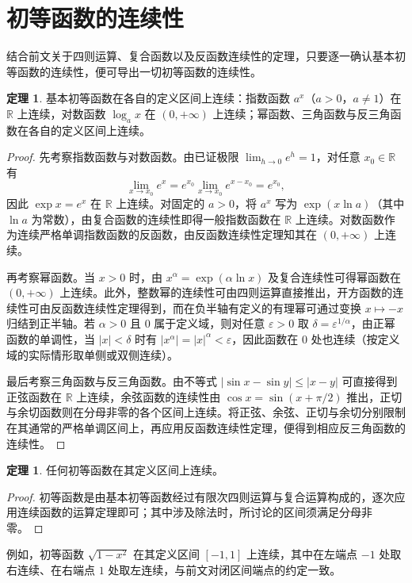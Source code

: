 \documentclass[UTF8,fontset=fandol,a4paper,12pt]{ctexart}
\newcommand{\R}{\mathbb R}
\theoremstyle{definition}
\newtheorem{theorem}[definition]{定理}
\begin{document}
\section{初等函数的连续性}
结合前文关于四则运算、复合函数以及反函数连续性的定理，只要逐一确认基本初等函数的连续性，便可导出一切初等函数的连续性。

\begin{theorem}
基本初等函数在各自的定义区间上连续：指数函数 $a^x$（$a>0$，$a\ne1$）在 $\R$ 上连续，对数函数 $\log_a x$ 在 $(0,+\infty)$ 上连续；幂函数、三角函数与反三角函数在各自的定义区间上连续。
\end{theorem}
\begin{proof}
先考察指数函数与对数函数。由已证极限 $\lim_{h\to0}e^h=1$，对任意 $x_0\in\R$ 有
\[
 \lim_{x\to x_0}e^x=e^{x_0}\lim_{x\to x_0}e^{x-x_0}=e^{x_0},
\]
因此 $\exp x=e^x$ 在 $\R$ 上连续。对固定的 $a>0$，将 $a^x$ 写为 $\exp(x\ln a)$（其中 $\ln a$ 为常数），由复合函数的连续性即得一般指数函数在 $\R$ 上连续。对数函数作为连续严格单调指数函数的反函数，由反函数连续性定理知其在 $(0,+\infty)$ 上连续。

再考察幂函数。当 $x>0$ 时，由 $x^\alpha=\exp(\alpha\ln x)$ 及复合连续性可得幂函数在 $(0,+\infty)$ 上连续。此外，整数幂的连续性可由四则运算直接推出，开方函数的连续性可由反函数连续性定理得到，而在负半轴有定义的有理幂可通过变换 $x\mapsto-x$ 归结到正半轴。若 $\alpha>0$ 且 $0$ 属于定义域，则对任意 $\varepsilon>0$ 取 $\delta=\varepsilon^{1/\alpha}$，由正幂函数的单调性，当 $|x|<\delta$ 时有 $|x^\alpha|=|x|^\alpha<\varepsilon$，因此函数在 $0$ 处也连续（按定义域的实际情形取单侧或双侧连续）。

最后考察三角函数与反三角函数。由不等式 $|\sin x-\sin y|\le|x-y|$ 可直接得到正弦函数在 $\R$ 上连续，余弦函数的连续性由 $\cos x=\sin(x+\pi/2)$ 推出，正切与余切函数则在分母非零的各个区间上连续。将正弦、余弦、正切与余切分别限制在其通常的严格单调区间上，再应用反函数连续性定理，便得到相应反三角函数的连续性。
\end{proof}

\begin{theorem}
任何初等函数在其定义区间上连续。
\end{theorem}
\begin{proof}
初等函数是由基本初等函数经过有限次四则运算与复合运算构成的，逐次应用连续函数的运算定理即可；其中涉及除法时，所讨论的区间须满足分母非零。
\end{proof}

例如，初等函数 $\sqrt{1-x^2}$ 在其定义区间 $[-1,1]$ 上连续，其中在左端点 $-1$ 处取右连续、在右端点 $1$ 处取左连续，与前文对闭区间端点的约定一致。
\end{document}
